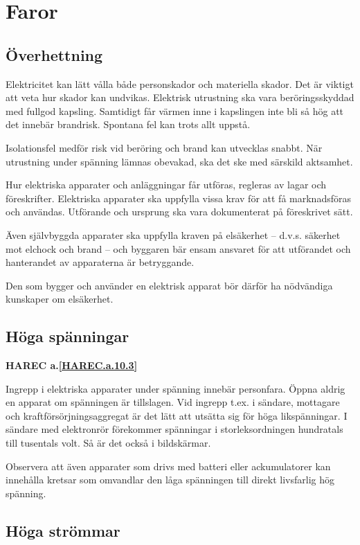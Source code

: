 \section{Faror}

\subsection{Överhettning}

Elektricitet kan lätt vålla både personskador och materiella
skador. Det är viktigt att veta hur skador kan undvikas. Elektrisk
utrustning ska vara beröringsskyddad med fullgod kapsling. Samtidigt
får värmen inne i kapslingen inte bli så hög att det innebär
brandrisk. Spontana fel kan trots allt uppstå.

Isolationsfel medför risk vid beröring och brand kan utvecklas snabbt.
När utrustning under spänning lämnas obevakad, ska det ske med särskild
aktsamhet.

Hur elektriska apparater och anläggningar får utföras, regleras av
lagar och föreskrifter. Elektriska apparater ska uppfylla vissa krav
för att få marknadsföras och användas. Utförande och ursprung ska
vara dokumenterat på föreskrivet sätt.

Även självbyggda apparater ska uppfylla kraven på elsäkerhet --
d.v.s. säkerhet mot elchock och brand -- och byggaren bär ensam
ansvaret för att utförandet och hanterandet av apparaterna är
betryggande.

Den som bygger och använder en elektrisk apparat bör därför ha
nödvändiga kunskaper om elsäkerhet.

\subsection{Höga spänningar}
\textbf{
HAREC a.\ref{HAREC.a.10.3}\label{myHAREC.a.10.3}
}

Ingrepp i elektriska apparater under spänning innebär
personfara. Öppna aldrig en apparat om spänningen är tillslagen. Vid
ingrepp t.ex. i sändare, mottagare och kraftförsörjningsaggregat är
det lätt att utsätta sig för höga likspänningar. I sändare med
elektronrör förekommer spänningar i storleksordningen hundratals till
tusentals volt. Så är det också i bildskärmar.

Observera att även apparater som drivs med batteri eller ackumulatorer
kan innehålla kretsar som omvandlar den låga spänningen till direkt
livsfarlig hög spänning.

\subsection{Höga strömmar}

